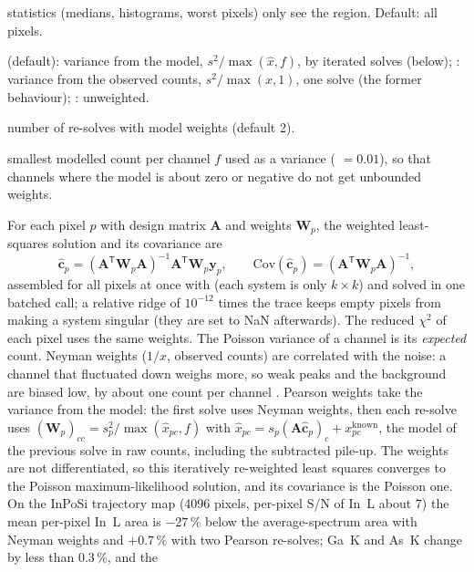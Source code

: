 \begin{args}
  statistics (medians, histograms, worst pixels) only see the region. Default: all pixels.
\item[weights]  (default): variance from the model, $s^2/\max(\hat x, f)$, by
  iterated solves (below); : variance from the observed counts,
  $s^2/\max(x,1)$, one solve (the former behaviour); : unweighted.
\item[pearson\_iterations] number of re-solves with model weights (default 2).
\item[model\_floor] smallest modelled count per channel $f$ used as a variance
  ( $=0.01$), so that channels where the model is about zero or
  negative do not get unbounded weights.
\end{args}
 For each pixel $p$ with design matrix $\mathbf A$ and weights $\mathbf W_p$, the
weighted least-squares solution and its covariance are
\begin{equation}
  \hat{\mathbf c}_p = (\mathbf A^\mathsf T\mathbf W_p\mathbf A)^{-1}\mathbf A^\mathsf T
  \mathbf W_p\mathbf y_p, \qquad
  \mathrm{Cov}(\hat{\mathbf c}_p) = (\mathbf A^\mathsf T\mathbf W_p\mathbf A)^{-1},
\end{equation}
assembled for all pixels at once with  (each system is only $k\times k$) and solved
in one batched call; a relative ridge of $10^{-12}$ times the trace keeps empty pixels from
making a system singular (they are set to NaN afterwards). The reduced $\chi^2$ of each pixel
uses the same weights.
 The Poisson variance of a channel is its \emph{expected} count. Neyman weights
($1/x$, observed counts) are correlated with the noise: a channel that fluctuated down weighs
more, so weak peaks and the background are biased low, by about one count per channel
\citep{Baker1984,Mighell1999}. Pearson weights take the variance from the model: the first
solve uses Neyman weights, then each re-solve uses
$(\mathbf W_p)_{cc} = s_p^2/\max(\hat x_{pc}, f)$ with $\hat x_{pc} = s_p(\mathbf A\hat{\mathbf
c}_p)_c + x^\mathrm{known}_{pc}$, the model of the previous solve in raw counts, including the
subtracted pile-up. The weights are not differentiated, so this iteratively re-weighted least
squares converges to the Poisson maximum-likelihood solution, and its covariance is the
Poisson one. On the InPoSi trajectory map (4096 pixels, per-pixel S/N of In~L about 7) the
mean per-pixel In~L area is $-27\,\%$ below the average-spectrum area with Neyman weights and
$+0.7\,\%$ with two Pearson re-solves; Ga~K and As~K change by less than $0.3\,\%$, and the
